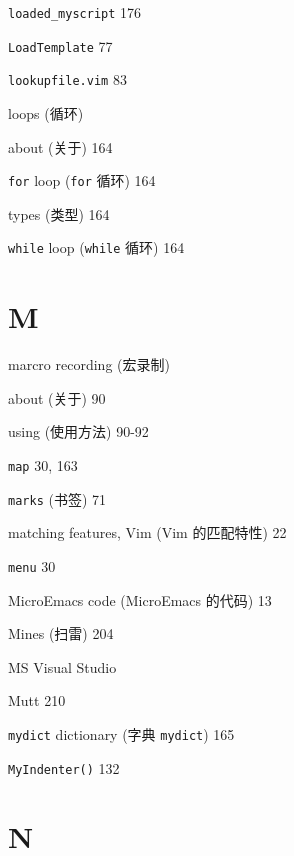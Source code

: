 \begin{multicols}{2}
\hangindent=2pc  \texttt{loaded\_myscript} 176

\hangindent=2pc  \texttt{LoadTemplate} 77

\hangindent=2pc  \texttt{lookupfile.vim} 83

\hangindent=2pc  loops (循环) \par
\hangindent=2pc \quad about (关于) 164 \par
\hangindent=2pc \quad \texttt{for} loop (\texttt{for} 循环) 164 \par
\hangindent=2pc \quad types (类型) 164 \par
\hangindent=2pc \quad \texttt{while} loop (\texttt{while} 循环) 164 \par

\hangindent=2pc  \section*{M}

\hangindent=2pc  marcro recording (宏录制) \par
\hangindent=2pc \quad about (关于) 90 \par
\hangindent=2pc \quad using (使用方法) 90-92 \par

\hangindent=2pc  \texttt{map} 30, 163

\hangindent=2pc  \texttt{marks} (书签) 71

\hangindent=2pc  matching features, Vim (Vim 的匹配特性) 22

\hangindent=2pc  \texttt{menu} 30

\hangindent=2pc  MicroEmacs code (MicroEmacs 的代码) 13

\hangindent=2pc  Mines (扫雷) 204

\hangindent=2pc  MS Visual Studio

\hangindent=2pc  Mutt 210

\hangindent=2pc  \texttt{mydict} dictionary (字典 \texttt{mydict}) 165

\hangindent=2pc  \texttt{MyIndenter()} 132

\hangindent=2pc  \section*{N}


\end{multicols}
